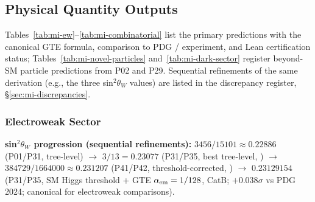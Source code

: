 \subsection{Physical Quantity Outputs}
\label{sec:mi-outputs}

Tables~\ref{tab:mi-ew}--\ref{tab:mi-combinatorial} list the primary predictions
with the canonical GTE formula, comparison to PDG / experiment, and Lean certification
status; Tables~\ref{tab:mi-novel-particles} and~\ref{tab:mi-dark-sector} register
beyond-SM particle predictions from P02 and P29.
Sequential refinements of the same derivation (e.g., the three sin$^2\theta_W$
values) are listed in the discrepancy register, \S\ref{sec:mi-discrepancies}.

\subsubsection{Electroweak Sector}
\label{sec:mi-ew}

\textbf{sin$^2\theta_W$ progression (sequential refinements):}
$3456/15101 \approx 0.22886$ (P01/P31, tree-level) $\to$
$3/13 = 0.23077$ (P31/P35, best tree-level, \CatAL) $\to$
$384729/1664000 \approx 0.231207$ (P41/P42, threshold-corrected, \CatAL) $\to$
$0.23129154$ (P31/P35, SM Higgs threshold + GTE $\alpha_{\rm em}=1/128$, CatB;
$+0.038\sigma$ vs PDG 2024; canonical for electroweak comparisons).

